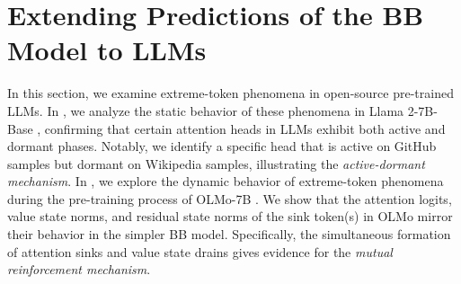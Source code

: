 \section{Extending Predictions of the BB Model to LLMs} \label{sec:llm}


In this section, we examine extreme-token phenomena in open-source pre-trained LLMs. In , we analyze the static behavior of these phenomena in Llama 2-7B-Base \citep{touvron2023llama}, confirming that certain attention heads in LLMs exhibit both active and dormant phases. Notably, we identify a specific head that is active on GitHub samples but dormant on Wikipedia samples, illustrating the \textit{active-dormant mechanism}. In , we explore the dynamic behavior of extreme-token phenomena during the pre-training process of OLMo-7B \citep{groeneveld2024olmo}. We show that the attention logits, value state norms, and residual state norms of the sink token(s) in OLMo mirror their behavior in the simpler BB model. Specifically, the simultaneous formation of attention sinks and value state drains gives evidence for the \textit{mutual reinforcement mechanism}.


